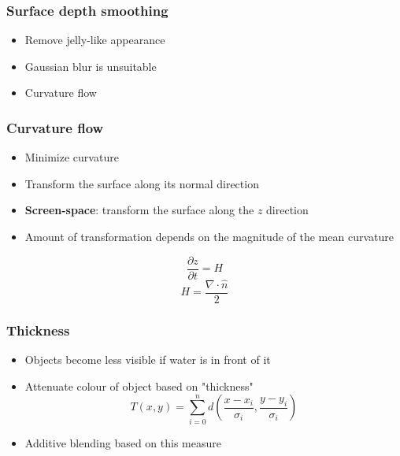 \documentclass{beamer}
\begin{document}
	\begin{frame}[t]\frametitle{Surface depth smoothing}
	    \begin{itemize}
	    	\item Remove jelly-like appearance
	    	\item Gaussian blur is unsuitable
	    	\item Curvature flow
	    \end{itemize}
	\end{frame}
	\begin{frame}[t]\frametitle{Curvature flow}
		\begin{itemize}
			\item Minimize curvature
			\item Transform the surface along its normal direction 
			\item \textbf{Screen-space}: transform the surface along the $z$ direction 
			\item Amount of transformation depends on the magnitude of the mean curvature
		\end{itemize}
		\begin{equation}
			\frac{\partial z}{\partial t} = H
		\end{equation}
		\begin{equation}
			H = \frac{\nabla \cdot \hat{n}}{2}
		\end{equation}
	\end{frame}
	\begin{frame}[t]\frametitle{Thickness}
	    \begin{itemize}
	    	\item Objects become less visible if water is in front of it
	    	\item Attenuate colour of object based on "thickness"
	    	\begin{equation}
	    		T(x, y) = \sum_{i = 0}^{n} d(\frac{x - x_i}{\sigma_i}, \frac{y - y_i}{\sigma_i})
	    	\end{equation}
	    	\item Additive blending based on this measure
	    \end{itemize}
	\end{frame}
\end{document}
